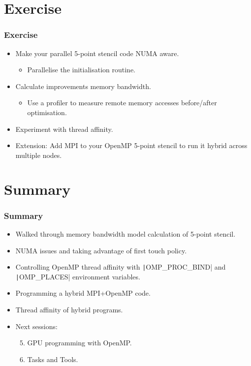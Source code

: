 \documentclass{beamer}
\begin{document}
\section{Exercise}
\begin{frame}
\frametitle{Exercise}
\begin{itemize}
  \item Make your parallel 5-point stencil code NUMA aware.
    \begin{itemize}
      \item Parallelise the initialisation routine.
    \end{itemize}
  \item Calculate improvements memory bandwidth.
    \begin{itemize}
      \item Use a profiler to measure remote memory accesses before/after optimisation.
    \end{itemize}
  \item Experiment with thread affinity.
  \item Extension: Add MPI to your OpenMP 5-point stencil to run it hybrid across multiple nodes.
\end{itemize}
\end{frame}

\section{Summary}
\begin{frame}
\frametitle{Summary}

\begin{itemize}
  \item Walked through memory bandwidth model calculation of 5-point stencil.
  \item NUMA issues and taking advantage of first touch policy.
  \item Controlling OpenMP thread affinity with \texttt|OMP_PROC_BIND| and \texttt|OMP_PLACES| environment variables.
  \item Programming a hybrid MPI+OpenMP code.
  \item Thread affinity of hybrid programs.
\end{itemize}

\vfill

\begin{itemize}
  \item Next sessions:
    \begin{enumerate}
      \setcounter{enumi}{4}
      \item GPU programming with OpenMP.
      \item Tasks and Tools.
    \end{enumerate}
\end{itemize}

\end{frame}

\end{document}
